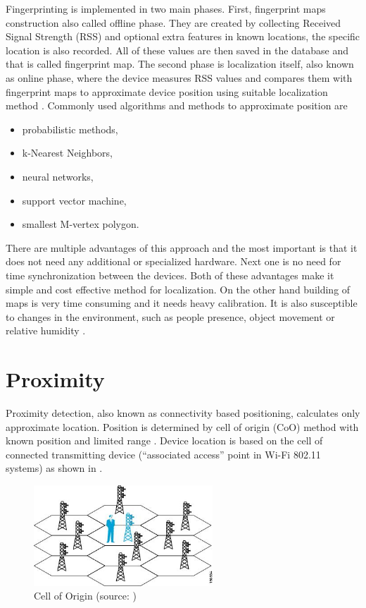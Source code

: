 Fingerprinting is implemented in two main phases. First, fingerprint maps construction also called offline phase. They are created by collecting Received Signal Strength (RSS) and optional extra features in known locations, the specific location is also recorded. All of these values are then saved in the database and that is called fingerprint map. The second phase is localization itself, also known as online phase, where the device measures RSS values and compares them with fingerprint maps to approximate device position using suitable localization method \cite{LocalizationApproaches, ILWTP}. Commonly used algorithms and methods to approximate position are \cite{IILUBLEB}

\begin{itemize}
	\item probabilistic methods,
	\item k-Nearest Neighbors,
	\item neural networks,
	\item support vector machine,
	\item smallest M-vertex polygon.
\end{itemize}

There are multiple advantages of this approach and the most important is that it does not need any additional or specialized hardware. Next one is no need for time synchronization between the devices. Both of these advantages make it simple and cost effective method for localization. On the other hand building of maps is very time consuming and it needs heavy calibration. It is also susceptible to changes in the environment, such as people presence, object movement or relative humidity \cite{IILUBLEB, RSSFofIFD}.

\section{Proximity}\label{sec:Proximity}
Proximity detection, also known as connectivity based positioning, calculates only approximate location. Position is determined by cell of origin (CoO) method with known position and limited range \cite{RAinWILTaS}. Device location is based on the cell of connected transmitting device (\enquote{associated access} point in Wi-Fi 802.11 systems) as shown in  \cite{WiFiLBS}.

\begin{figure}[h!]
	\begin{centering}
		\includegraphics[width=0.6\textwidth]{img/cell_of_origin}
		\par\end{centering}
	\caption{Cell of Origin (source: \cite{WiFiLBS})\label{fig:CellOfOrigin}}
	\label{fig04c02}
\end{figure}

